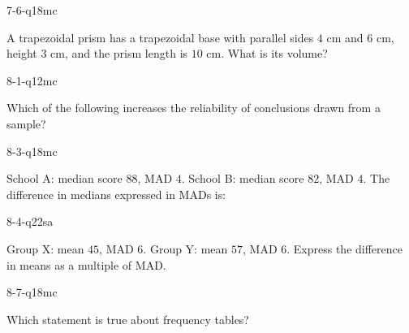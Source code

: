 \begin{practiceQuestion}{7-6-q18}{mc}
\begin{questionText}
A trapezoidal prism has a trapezoidal base with parallel sides $4$ cm and $6$ cm, height $3$ cm, and the prism length is $10$ cm. What is its volume?
\end{questionText}
\end{practiceQuestion}

\begin{practiceQuestion}{8-1-q12}{mc}
\begin{questionText}
Which of the following increases the reliability of conclusions drawn from a sample?
\end{questionText}
\end{practiceQuestion}

\begin{practiceQuestion}{8-3-q18}{mc}
\begin{questionText}
School A: median score $88$, MAD $4$. School B: median score $82$, MAD $4$. The difference in medians expressed in MADs is:
\end{questionText}
\end{practiceQuestion}

\begin{practiceQuestion}{8-4-q22}{sa}
\begin{questionText}
Group X: mean $45$, MAD $6$. Group Y: mean $57$, MAD $6$. Express the difference in means as a multiple of MAD.
\end{questionText}
\end{practiceQuestion}

\begin{practiceQuestion}{8-7-q18}{mc}
\begin{questionText}
Which statement is true about frequency tables?
\end{questionText}
\end{practiceQuestion}

